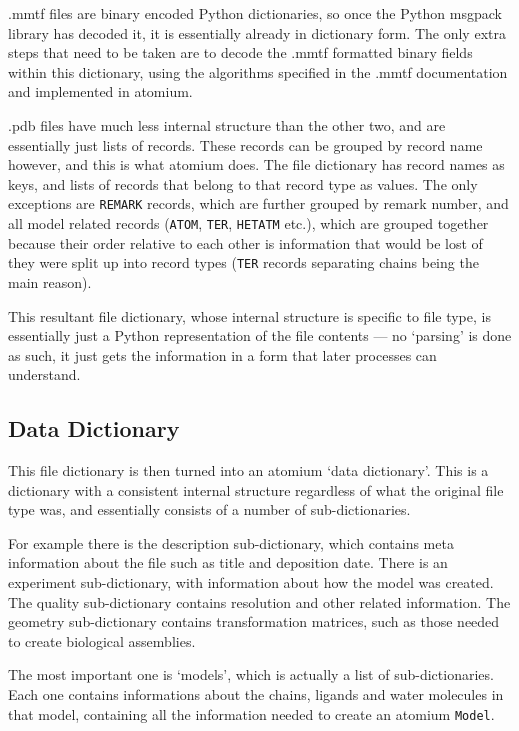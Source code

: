 .mmtf files are binary encoded Python dictionaries, so once the Python msgpack library has decoded it, it is essentially already in dictionary form. The only extra steps that need to be taken are to decode the .mmtf formatted binary fields within this dictionary, using the algorithms specified in the .mmtf documentation and implemented in atomium.

.pdb files have much less internal structure than the other two, and are essentially just lists of records. These records can be grouped by record name however, and this is what atomium does. The file dictionary has record names as keys, and lists of records that belong to that record type as values. The only exceptions are \texttt{REMARK} records, which are further grouped by remark number, and all model related records (\texttt{ATOM}, \texttt{TER}, \texttt{HETATM} etc.), which are grouped together because their order relative to each other is information that would be lost of they were split up into record types (\texttt{TER} records separating chains being the main reason).

This resultant file dictionary, whose internal structure is specific to file type, is essentially just a Python representation of the file contents --- no `parsing' is done as such, it just gets the information in a form that later processes can understand.

\subsection{Data Dictionary}

This file dictionary is then turned into an atomium `data dictionary'. This is a dictionary with a consistent internal structure regardless of what the original file type was, and essentially consists of a number of sub-dictionaries.

For example there is the description sub-dictionary, which contains meta information about the file such as title and deposition date. There is an experiment sub-dictionary, with information about how the model was created. The quality sub-dictionary contains resolution and other related information. The geometry sub-dictionary contains transformation matrices, such as those needed to create biological assemblies.

The most important one is `models', which is actually a list of sub-dictionaries. Each one contains informations about the chains, ligands and water molecules in that model, containing all the information needed to create an atomium \texttt{Model}.


